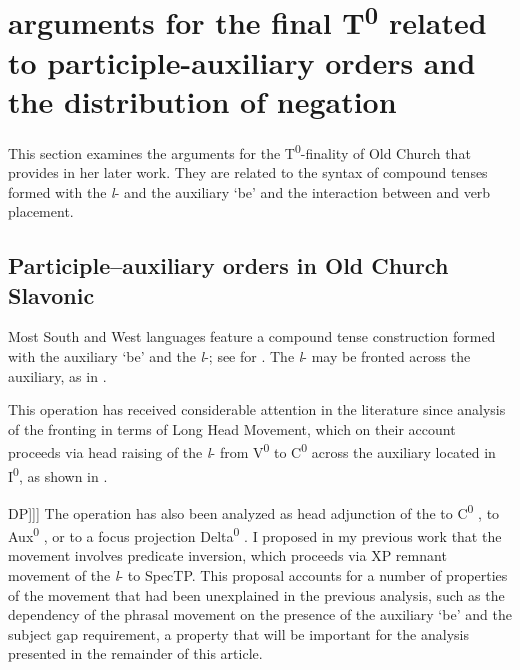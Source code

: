 \documentclass[output=paper,modfonts,newtxmath,hidelinks]{langscibook}
\begin{document}
\section{ arguments for the final T\textsuperscript{0} related to participle-auxiliary orders and the distribution of negation} \label{11:s3}

This section examines the arguments for the T\textsuperscript{0}{}-finality of Old Church  that \citet{pancheva2008} provides in her later work. They are related to the syntax of compound tenses formed with the \textit{l}{}- and the auxiliary `be' and the interaction between  and verb placement.

\subsection{Participle--auxiliary orders in Old Church Slavonic} \label{11:s3.1}

Most South and West  languages feature a compound tense construction formed with the auxiliary ‘be’ and the \textit{l}{}-; see  for . The \textit{l}{}- may be fronted across the auxiliary, as in . 

\ea \label{11:ex14}
	\label{11:ex14a}
	\label{11:ex14b}
	\z
\z
This operation has received considerable attention in the literature since  analysis of the fronting in terms of Long Head Movement, which on their account proceeds via head raising of the \textit{l}{}- from V\textsuperscript{0} to C\textsuperscript{0} across the auxiliary located in I\textsuperscript{0}, as shown in .

\ea \label{11:ex15}
\glt [\textsubscript{CP} [\textsubscript{C} Part\textit{\textsubscript{i}}] [\textsubscript{IP} Aux [\textsubscript{VP} [\textsubscript{V} t\textit{\textsubscript{i}}] DP]]]
\z
The operation has also been analyzed as head adjunction of the  to C\textsuperscript{0} \citep{wilder-cavar1994}, to Aux\textsuperscript{0} \citep{boskovic1997}, or to a focus projection Delta\textsuperscript{0}  \citep{lambova2003}. I proposed in my previous work \citep{broekhuis-migdalski2003,migdalski2006} that the movement involves predicate inversion, which proceeds via XP remnant movement of the \textit{l}{}- to SpecTP. This proposal accounts for a number of properties of the movement that had been unexplained in the previous analysis, such as the dependency of the phrasal movement on the presence of the auxiliary `be' and the subject gap requirement, a property that will be important for the analysis presented in the remainder of this article.
\end{document}
